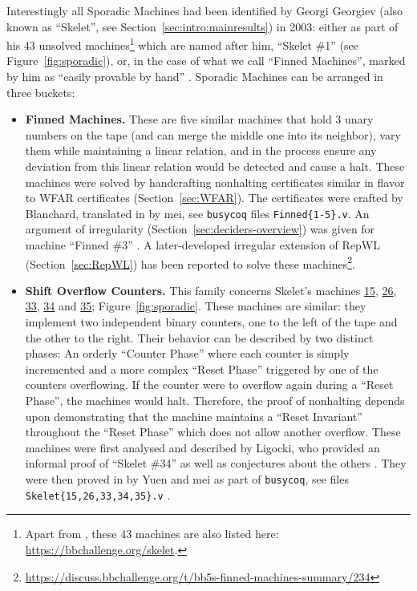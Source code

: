 Interestingly all Sporadic Machines had been identified by Georgi Georgiev (also known as ``Skelet'', see Section~\ref{sec:intro:mainresults}) in 2003: either as part of his 43 unsolved machines\footnote{Apart from \cite{Skelet_bbfind_list}, these 43 machines are also listed here: \url{https://bbchallenge.org/skelet}.} which are named after him, \eg ``Skelet \#1'' (see Figure~\ref{fig:sporadic}), or, in the case of what we call ``Finned Machines'', marked by him as ``easily provable by hand'' \cite{Skelet_bbfind_list}. Sporadic Machines can be arranged in three buckets:
\begin{itemize}
    \item \textbf{Finned Machines.} These are five similar machines that hold 3 unary numbers on the tape (and can merge the middle one into its neighbor), vary them while maintaining a linear relation, and in the process ensure any deviation from this linear relation would be detected and cause a halt. These machines were solved by handcrafting nonhalting certificates similar in flavor to WFAR certificates (Section~\ref{sec:WFAR}). The certificates were crafted by Blanchard, translated in \Coq by mei, see \texttt{busycoq} files \texttt{Finned\{1-5\}.v}. An argument of irregularity (Section~\ref{sec:deciders-overview}) was given for machine ``Finned \#3'' \cite{irregularFinned3}. A later-developed irregular extension of RepWL (Section~\ref{sec:RepWL}) has been reported to solve these machines\footnote{\url{https://discuss.bbchallenge.org/t/bb5s-finned-machines-summary/234}}.
    \item \textbf{Shift Overflow Counters.} This family concerns Skelet's machines \href{https://bbchallenge.org/1RB---_1RC1LB_1LD1RE_1LB0LD_1RA0RC}{15}, \href{https://bbchallenge.org/1RB1LD_1RC0RB_1LA1RC_1LE0LA_1LC---}{26}, \href{https://bbchallenge.org/1RB1LC_0RC0RB_1LD0LA_1LE---_1LA1RE}{33}, \href{https://bbchallenge.org/1RB1LC_0RC0RB_1LD0LA_1LE---_1LA1RA}{34} and \href{https://bbchallenge.org/1RB1LC_0RC0RB_1LD0LA_1LE---_1LA0LA}{35}; Figure~\ref{fig:sporadic}. These machines are similar: they implement two independent binary counters, one to the left of the tape and the other to the right. Their behavior can be described by two distinct phases: An orderly ``Counter Phase'' where each counter is simply incremented and a more complex ``Reset Phase'' triggered by one of the counters overflowing. If the counter were to overflow again during a ``Reset Phase'', the machines would halt. Therefore, the proof of nonhalting depends upon demonstrating that the machine maintains a ``Reset Invariant'' throughout the ``Reset Phase'' which does not allow another overflow. These machines were first analysed and described by Ligocki, who provided an informal proof of ``Skelet \#34'' as well as conjectures about the others \cite{ShawnSOC}. They were then proved in \Coq by Yuen and mei as part of \texttt{busycoq}, see files \texttt{Skelet\{15,26,33,34,35\}.v} \cite{busycoq}.

\end{itemize}
